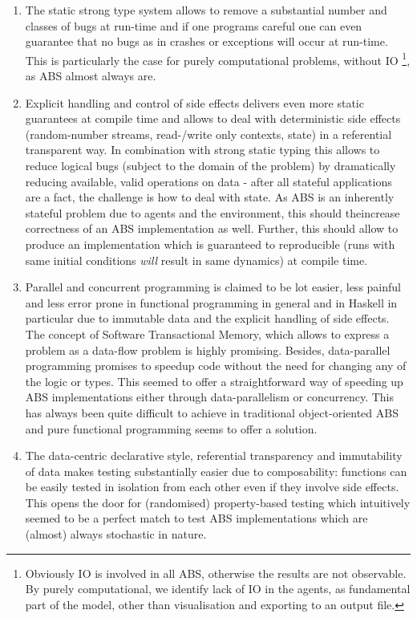 \begin{enumerate}
	\item The static strong type system allows to remove a substantial number and classes of bugs at run-time and if one programs careful one can even guarantee that no bugs as in crashes or exceptions will occur at run-time. This is particularly the case for purely computational problems, without IO \footnote{Obviously IO is involved in all ABS, otherwise the results are not observable. By purely computational, we identify lack of IO in the agents, as fundamental part of the model, other than visualisation and exporting to an output file.}, as ABS almost always are. 
	
	\item Explicit handling and control of side effects delivers even more static guarantees at compile time and allows to deal with deterministic side effects (random-number streams, read-/write only contexts, state) in a referential transparent way. In combination with strong static typing this allows to reduce logical bugs (subject to the domain of the problem) by dramatically reducing available, valid operations on data - after all stateful applications are a fact, the challenge is how to deal with state. As ABS is an inherently stateful problem due to agents and the environment, this should  theincrease correctness of an ABS implementation as well. Further, this should allow to produce an implementation which is guaranteed to reproducible (runs with same initial conditions \textit{will} result in same dynamics) at compile time.
	
	\item Parallel and concurrent programming is claimed to be lot easier, less painful and less error prone in functional programming in general and in Haskell in particular due to immutable data and the explicit handling of side effects. The concept of Software Transactional Memory, which allows to express a problem as a data-flow problem is highly promising. Besides, data-parallel programming promises to speedup code without the need for changing any of the logic or types. This seemed to offer a straightforward way of speeding up ABS implementations either through data-parallelism or concurrency. This has always been quite difficult to achieve in traditional object-oriented ABS and pure functional programming seems to offer a solution.
	
	\item The data-centric declarative style, referential transparency and immutability of data makes testing substantially easier due to composability: functions can be easily tested in isolation from each other even if they involve side effects. This opens the door for (randomised) property-based testing which intuitively seemed to be a perfect match to test ABS implementations which are (almost) always stochastic in nature.
\end{enumerate}

